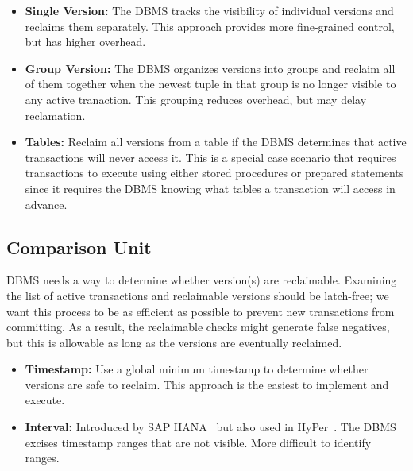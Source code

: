\documentclass[11pt]{article}
\begin{document}
\begin{itemize}
    \item \textbf{Single Version:}
    The DBMS tracks the visibility of individual versions and reclaims them 
    separately. This approach provides more fine-grained control, but has higher overhead.
    
    \item \textbf{Group Version:}
    The DBMS organizes versions into groups and reclaim all of them together when the newest tuple 
    in that group is no longer visible to any active tranaction. This grouping reduces overhead, 
    but may delay reclamation.
    
    \item \textbf{Tables:}
    Reclaim all versions from a table if the DBMS determines that active 
    transactions will never access it. This is a special case scenario that requires 
    transactions to execute using either stored procedures or prepared statements since it requires 
    the DBMS knowing what tables a transaction will access in advance.

\end{itemize}

\subsection*{Comparison Unit}
DBMS needs a way to determine whether version(s) are reclaimable. Examining the list of active 
transactions and reclaimable versions should be latch-free; we want this process to be as efficient 
as possible to prevent new transactions from committing. As a result, the reclaimable checks might 
generate false negatives, but this is allowable as long as the versions are eventually reclaimed.

\begin{itemize}
    \item \textbf{Timestamp:}
    Use a global minimum timestamp to determine whether versions 
    are safe to reclaim. This approach is the easiest to implement and execute.
    
    \item \textbf{Interval:}
    Introduced by SAP HANA~\cite{jlee2016sap} but also used in HyPer~\cite{bottcher19}. The 
    DBMS excises timestamp ranges that are not visible. More difficult to identify ranges. 
\end{itemize}
\end{document}
